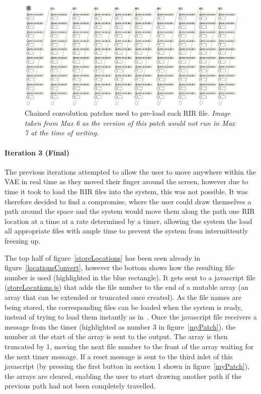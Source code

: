 \documentclass[../../main.tex]{subfiles}
\begin{document}
			\begin{figure}[t]
				\centerline{\includegraphics[width=\textwidth]{Sections/Implementation/Max/images/Max/Iteration2/preload.png}}
				\caption{Chained convolution patches used to pre-load each \ac{RIR} file. \textit{Image taken from Max 6 as the version of this patch would not run in Max 7 at the time of writing.}}
				\label{preload}
			\end{figure}


		 \paragraph{Iteration 3 (Final)}
		 \label{iteration3}

		 	The previous iterations attempted to allow the user to move anywhere within the \ac{VAE} in real time as they moved their finger around the screen, however due to time it took to load the \ac{RIR} files into the system, this was not possible. It was therefore decided to find a compromise, where the user could draw themselves a path around the space and the system would move them along the path one \ac{RIR} location at a time at a rate determined by a timer, allowing the system the load all appropriate files with ample time to prevent the system from intermittently freezing up.

		 	The top half of figure~\ref{storeLocations} has been seen already in figure~\ref{locationsConvert}, however the bottom shows how the resulting file number is used (highlighted in the blue rectangle). It gets sent to a javascript file (\href{http://lt669.github.io/code/javascript/html/storeLocations.html}{storeLocations.js}) that adds the file number to the end of a mutable array (an array that can be extended or truncated once created). As the file names are being stored, the corresponding files can be loaded when the system is ready, instead of trying to load them instantly as in~. Once the javascript file receivers a message from the timer (highlighted as number 3 in figure~\ref{myPatch}), the number at the start of the array is sent to the output. The array is then truncated by 1, moving the next file number to the front of the array waiting for the next timer message. If a reset message is sent to the third inlet of this javascript (by pressing the first button in section 1 shown in figure~\ref{myPatch}), the arrays are cleared, enabling the user to start drawing another path if the previous path had not been completely travelled.
\end{document}
